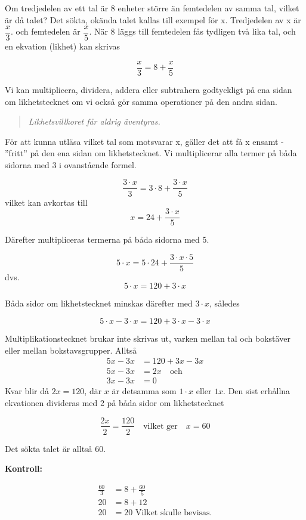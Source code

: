 Om tredjedelen av ett tal är 8 enheter större än femtedelen av samma tal, vilket
är då talet?
Det sökta, okända talet kallas till exempel för x.
Tredjedelen av x är \(\dfrac{x}{3}\). och femtedelen är \(\dfrac{x}{5}\).
När 8 läggs till femtedelen fås tydligen två lika tal, och en ekvation (likhet)
kan skrivas

\[\dfrac{x}{3}=8 + \dfrac{x}{5}\]

Vi kan multiplicera, dividera, addera eller subtrahera godtyckligt på ena sidan
om likhetstecknet om vi också gör samma operationer på den andra sidan.

\begin{quote}\emph{
Likhetsvillkoret får aldrig äventyras.
}\end{quote}

För att kunna utläsa vilket tal som motsvarar x, gäller det att få x ensamt -
''fritt'' på den ena sidan om likhetstecknet.
Vi multiplicerar alla termer på båda sidorna med 3 i ovanstående formel.

\[\frac{3 \cdot x}{3} = 3 \cdot 8 + \frac{3 \cdot x}{5}\]
vilket kan avkortas till
\[x = 24 + \frac{3 \cdot x}{5}\]

Därefter multipliceras termerna på båda sidorna med 5.

\[5 \cdot x = 5 \cdot 24 + \frac{3 \cdot x \cdot 5}{5}\]
dvs.
\[5 \cdot x = 120 + 3 \cdot x\]

Båda sidor om likhetstecknet minskas därefter med \(3 \cdot x\), således

\[5 \cdot x - 3 \cdot x = 120 + 3 \cdot x - 3 \cdot x\]

Multiplikationstecknet brukar inte skrivas ut, varken mellan tal och bokstäver
eller mellan bokstavsgrupper.
Alltså
\begin{align*}
5x - 3x &= 120 + 3x - 3x \\
5x - 3x &= 2x \quad \text{och} \\
3x - 3x &= 0
\end{align*}
Kvar blir då \(2x = 120\), där \(x\) är detsamma som \(1 \cdot x\) eller \(1x\).
Den sist erhållna ekvationen divideras med 2 på båda sidor om likhetstecknet

\[
\frac{2x}{2} = \frac{120}{2}
\quad \text{vilket ger} \quad
x = 60
\]

Det sökta talet är alltså 60.

\textbf{Kontroll:}

\begin{align*}
\frac{60}{3} & = 8 + \frac{60}{5}\\
          20 &= 8 + 12 \\
          20 &= 20\text{ Vilket skulle bevisas.}
\end{align*}

